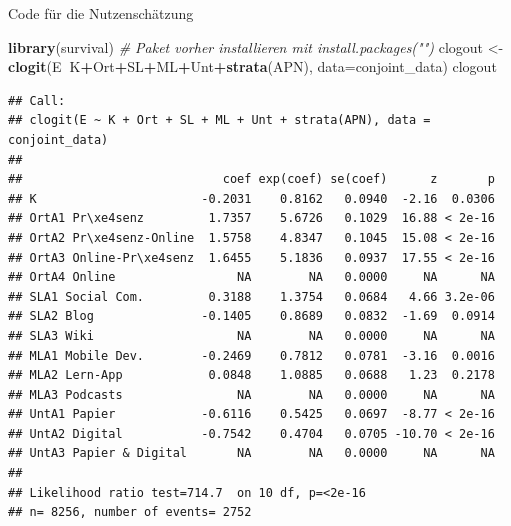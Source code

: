 \documentclass[12pt,ngerman,a4paper,ignorenonframetext,]{beamer}
\newenvironment{Shaded}{\begin{snugshade}}{\end{snugshade}}
\newcommand{\CommentTok}[1]{\textcolor[rgb]{0.56,0.35,0.01}{\textit{#1}}}
\newcommand{\DataTypeTok}[1]{\textcolor[rgb]{0.13,0.29,0.53}{#1}}
\newcommand{\KeywordTok}[1]{\textcolor[rgb]{0.13,0.29,0.53}{\textbf{#1}}}
\newcommand{\NormalTok}[1]{#1}
\newcommand{\OperatorTok}[1]{\textcolor[rgb]{0.81,0.36,0.00}{\textbf{#1}}}
\newcommand{\StringTok}[1]{\textcolor[rgb]{0.31,0.60,0.02}{#1}}
\begin{document}
\begin{frame}{Code für die Nutzenschätzung}
\protect\hypertarget{code-fur-die-nutzenschatzung}{}

\begin{Shaded}
\begin{Highlighting}[]
\KeywordTok{library}\NormalTok{(survival) }\CommentTok{# Paket vorher installieren mit install.packages("")}
\NormalTok{clogout <-}\StringTok{ }\KeywordTok{clogit}\NormalTok{(E}\OperatorTok{~}\NormalTok{K}\OperatorTok{+}\NormalTok{Ort}\OperatorTok{+}\NormalTok{SL}\OperatorTok{+}\NormalTok{ML}\OperatorTok{+}\NormalTok{Unt}\OperatorTok{+}\KeywordTok{strata}\NormalTok{(APN), }\DataTypeTok{data=}\NormalTok{conjoint_data)}
\NormalTok{clogout}
\end{Highlighting}
\end{Shaded}

\begin{verbatim}
## Call:
## clogit(E ~ K + Ort + SL + ML + Unt + strata(APN), data = conjoint_data)
## 
##                            coef exp(coef) se(coef)      z       p
## K                       -0.2031    0.8162   0.0940  -2.16  0.0306
## OrtA1 Pr\xe4senz         1.7357    5.6726   0.1029  16.88 < 2e-16
## OrtA2 Pr\xe4senz-Online  1.5758    4.8347   0.1045  15.08 < 2e-16
## OrtA3 Online-Pr\xe4senz  1.6455    5.1836   0.0937  17.55 < 2e-16
## OrtA4 Online                 NA        NA   0.0000     NA      NA
## SLA1 Social Com.         0.3188    1.3754   0.0684   4.66 3.2e-06
## SLA2 Blog               -0.1405    0.8689   0.0832  -1.69  0.0914
## SLA3 Wiki                    NA        NA   0.0000     NA      NA
## MLA1 Mobile Dev.        -0.2469    0.7812   0.0781  -3.16  0.0016
## MLA2 Lern-App            0.0848    1.0885   0.0688   1.23  0.2178
## MLA3 Podcasts                NA        NA   0.0000     NA      NA
## UntA1 Papier            -0.6116    0.5425   0.0697  -8.77 < 2e-16
## UntA2 Digital           -0.7542    0.4704   0.0705 -10.70 < 2e-16
## UntA3 Papier & Digital       NA        NA   0.0000     NA      NA
## 
## Likelihood ratio test=714.7  on 10 df, p=<2e-16
## n= 8256, number of events= 2752
\end{verbatim}

\end{frame}
\end{document}
